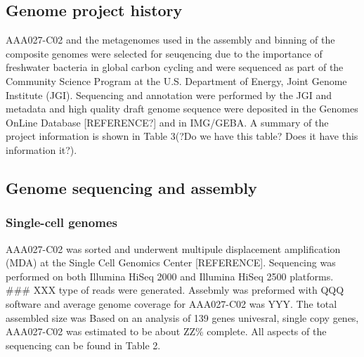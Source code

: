 \documentclass{bmcart}
\begin{document}
\subsection*{Genome project history}
AAA027-C02 and the metagenomes used in the assembly and binning of the composite genomes were selected for seuqencing due to the importance of freshwater bacteria in global carbon cycling and were sequenced as part of the Community Science Program at the U.S. Department of Energy, Joint Genome Institute (JGI).  Sequencing and annotation were performed by the JGI and metadata and high quality draft genome sequence were deposited in the Genomes OnLine Database [REFERENCE?] and in IMG/GEBA.  A summary of the project information is shown in Table 3(?Do we have this table? Does it have this information it?).

\subsection*{Genome sequencing and assembly}
\subsubsection*{Single-cell genomes}
AAA027-C02 was sorted and underwent multipule displacement amplification (MDA) at the Single Cell Genomics Center [REFERENCE].  Sequencing was performed on both Illumina HiSeq 2000 and Illumina HiSeq 2500 platforms.  ### XXX type of reads were generated.  Assebmly was preformed with QQQ software and average genome coverage for AAA027-C02 was YYY.  The total assembled size was Based on an analysis of 139 genes univesral, single copy genes, AAA027-C02 was estimated to be about ZZ\% complete. All aspects of the sequencing can be found in Table 2.
\end{document}
